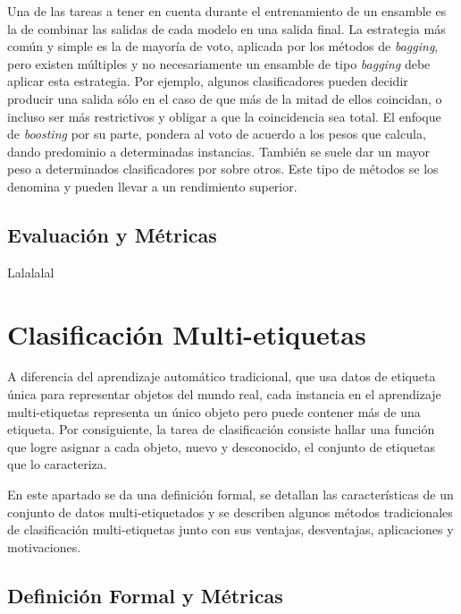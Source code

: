 \begin{description}
\end{description}

Una de las tareas a tener en cuenta durante el entrenamiento de un ensamble es
la de combinar las salidas de cada modelo en una salida final. La estrategia más
común y simple es la de mayoría de voto, aplicada por los métodos de
\textit{bagging}, pero existen múltiples y no necesariamente un ensamble de tipo
\textit{bagging} debe aplicar esta estrategia. Por ejemplo, algunos
clasificadores pueden decidir producir una salida sólo en el caso de que más de
la mitad de ellos coincidan, o incluso ser más restrictivos y obligar a que la
coincidencia sea total. El enfoque de \textit{boosting} por su parte, pondera al
voto de acuerdo a los pesos que calcula, dando predominio a determinadas
instancias.  También se suele dar un mayor peso a determinados clasificadores
por sobre otros. Este tipo de métodos se los denomina  y pueden llevar a un rendimiento superior.



\subsection{Evaluación y Métricas}
\label{clasificacion_evaluacion}

Lalalalal

\section{Clasificación Multi-etiquetas}

A diferencia del aprendizaje automático tradicional, que usa datos de etiqueta
única para representar objetos del mundo real, cada instancia en el aprendizaje
multi-etiquetas representa un único objeto pero puede contener más de una
etiqueta. Por consiguiente, la tarea de clasificación consiste hallar una
función que logre asignar a cada objeto, nuevo y desconocido, el conjunto de
etiquetas que lo caracteriza.

En este apartado se da una definición formal, se detallan las características de
un conjunto de datos multi-etiquetados y se  describen algunos métodos
tradicionales de clasificación multi-etiquetas junto con sus ventajas,
desventajas, aplicaciones y motivaciones.

\subsection{Definición Formal y Métricas}
\label{mll_def_formal}

